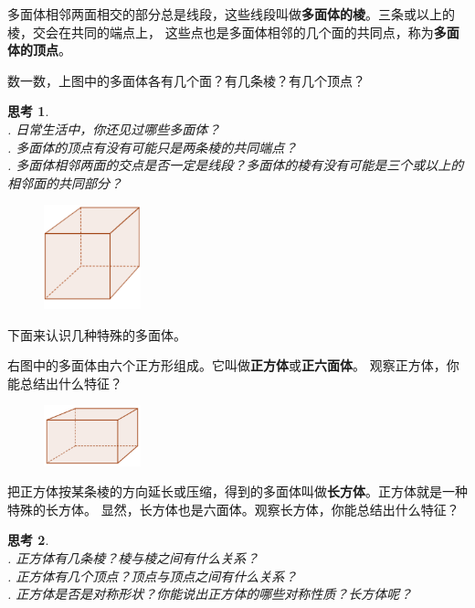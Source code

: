 \documentclass[12pt,UTF8]{ctexbook}
\newtheorem{sk}{思考}[section]
\begin{document}
多面体相邻两面相交的部分总是线段，这些线段叫做\textbf{多面体的棱}。三条或以上的棱，交会在共同的端点上，
这些点也是多面体相邻的几个面的共同点，称为\textbf{多面体的顶点}。

数一数，上图中的多面体各有几个面？有几条棱？有几个顶点？

\begin{sk}
    \mbox{}\\
    . 日常生活中，你还见过哪些多面体？\\
    . 多面体的顶点有没有可能只是两条棱的共同端点？\\
    . 多面体相邻两面的交点是否一定是线段？多面体的棱有没有可能是三个或以上的相邻面的共同部分？    
\end{sk}

\begin{figure} %
    \vspace{-50pt}
    \flushright
    \includegraphics[width=0.25\textwidth]{正方体1.png}
\end{figure}

下面来认识几种特殊的多面体。

右图中的多面体由六个正方形组成。它叫做\textbf{正方体}或\textbf{正六面体}。
观察正方体，你能总结出什么特征？

\begin{figure} %
    \vspace{-20pt}
    \flushright
    \includegraphics[width=0.25\textwidth]{长方体1.png}
\end{figure}

把正方体按某条棱的方向延长或压缩，得到的多面体叫做\textbf{长方体}。正方体就是一种特殊的长方体。
显然，长方体也是六面体。观察长方体，你能总结出什么特征？

\begin{sk}
    \mbox{}\\
    . 正方体有几条棱？棱与棱之间有什么关系？\\
    . 正方体有几个顶点？顶点与顶点之间有什么关系？\\
    . 正方体是否是对称形状？你能说出正方体的哪些对称性质？长方体呢？
\end{sk}
\end{document}
